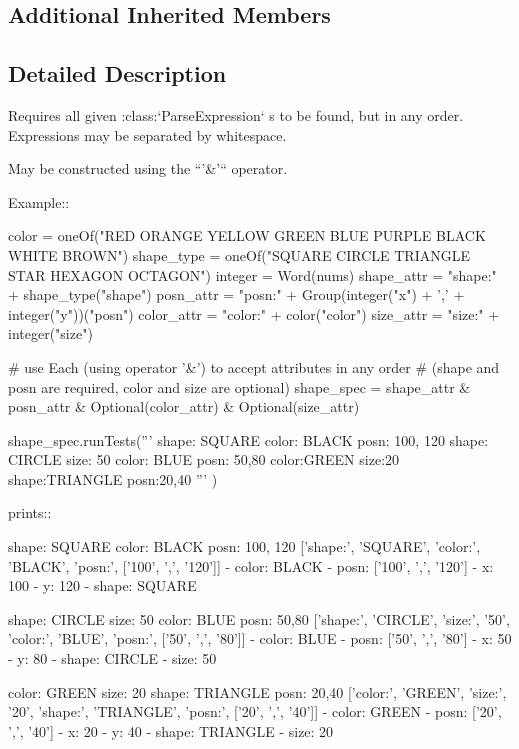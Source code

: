 \subsection*{Additional Inherited Members}


\subsection{Detailed Description}
\begin{DoxyVerb}Requires all given :class:`ParseExpression` s to be found, but in
any order. Expressions may be separated by whitespace.

May be constructed using the ``'&'`` operator.

Example::

    color = oneOf("RED ORANGE YELLOW GREEN BLUE PURPLE BLACK WHITE BROWN")
    shape_type = oneOf("SQUARE CIRCLE TRIANGLE STAR HEXAGON OCTAGON")
    integer = Word(nums)
    shape_attr = "shape:" + shape_type("shape")
    posn_attr = "posn:" + Group(integer("x") + ',' + integer("y"))("posn")
    color_attr = "color:" + color("color")
    size_attr = "size:" + integer("size")

    # use Each (using operator '&') to accept attributes in any order
    # (shape and posn are required, color and size are optional)
    shape_spec = shape_attr & posn_attr & Optional(color_attr) & Optional(size_attr)

    shape_spec.runTests('''
        shape: SQUARE color: BLACK posn: 100, 120
        shape: CIRCLE size: 50 color: BLUE posn: 50,80
        color:GREEN size:20 shape:TRIANGLE posn:20,40
        '''
        )

prints::

    shape: SQUARE color: BLACK posn: 100, 120
    ['shape:', 'SQUARE', 'color:', 'BLACK', 'posn:', ['100', ',', '120']]
    - color: BLACK
    - posn: ['100', ',', '120']
      - x: 100
      - y: 120
    - shape: SQUARE


    shape: CIRCLE size: 50 color: BLUE posn: 50,80
    ['shape:', 'CIRCLE', 'size:', '50', 'color:', 'BLUE', 'posn:', ['50', ',', '80']]
    - color: BLUE
    - posn: ['50', ',', '80']
      - x: 50
      - y: 80
    - shape: CIRCLE
    - size: 50


    color: GREEN size: 20 shape: TRIANGLE posn: 20,40
    ['color:', 'GREEN', 'size:', '20', 'shape:', 'TRIANGLE', 'posn:', ['20', ',', '40']]
    - color: GREEN
    - posn: ['20', ',', '40']
      - x: 20
      - y: 40
    - shape: TRIANGLE
    - size: 20
\end{DoxyVerb}
 

